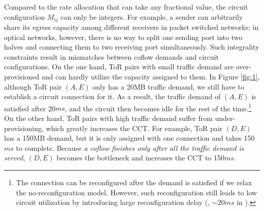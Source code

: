 Compared to the rate allocation that can take any fractional value,
the circuit configuration $M_{ij}$ can only be integers.
For example, a sender can arbitrarily share its egress capacity among different receivers in packet switched networks; in optical networks, however, there is no way to split one sending port into two halves and connecting them to two receiving port simultaneously.
Such integrality constraints result in mismatches between coflow demands and circuit configurations.
On the one hand, ToR pairs with small traffic demand are over-provisioned and can hardly utilize the capacity assigned to them.
In Figure \ref{fig:1}, although ToR pair $(A,E)$ only has a 20MB traffic demand, we still have to establish a circuit connection for it.
As a result, the traffic demand of $(A,E)$ is satisfied after 20$ms$, and the circuit then becomes idle for the rest of the time.\footnote{The connection can be reconfigured after the demand is satisfied if we relax the no-reconfiguration model. However, such reconfiguration still leads to low circuit utilization by introducing large reconfiguration delay (\ie, $\sim$20$ms$ in \cite{megaswitch}). }
On the other hand, ToR pairs with high traffic demand suffer from under-provisioning, which greatly increases the CCT.
For example, ToR pair $(D,E)$ has a 150MB demand, but it is only assigned with one connection and takes 150$ms$ to complete.
Because \emph{a coflow finishes only after all the traffic demand is served}, $(D,E)$ becomes the bottleneck and increases the CCT to 150$ms$.

